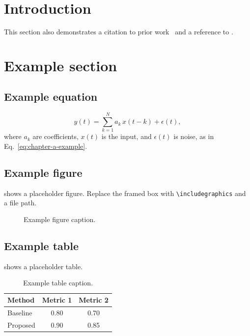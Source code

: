 \section{Introduction}
\lipsum[1]
This section also demonstrates a citation to prior work~\cite{lamport1994latex,knuth1984texbook,shannon1948mathematical,he2016deep} and a reference to .

\section{Example section}
\lipsum[2]

\subsection{Example equation}
\begin{equation}
  y(t) = \sum_{k=1}^{N} a_k\, x(t-k) + \epsilon(t),
  \label{eq:chapter-a-example}
\end{equation}
where $a_k$ are coefficients, $x(t)$ is the input, and $\epsilon(t)$ is noise, as in Eq.~\eqref{eq:chapter-a-example}.

\subsection{Example figure}
 shows a placeholder figure. Replace the framed box with \verb|\includegraphics| and a file path.

\begin{figure}[htbp]
  \centering
  \caption{Example figure caption.}
\end{figure}

\subsection{Example table}
 shows a placeholder table.

\begin{table}[htbp]
  \centering
  \caption{Example table caption.}
  \begin{tabular}{lcc}
    \hline
    Method   & Metric 1 & Metric 2 \\
    \hline
    Baseline & 0.80     & 0.70     \\
    Proposed & 0.90     & 0.85     \\
    \hline
  \end{tabular}
\end{table}

